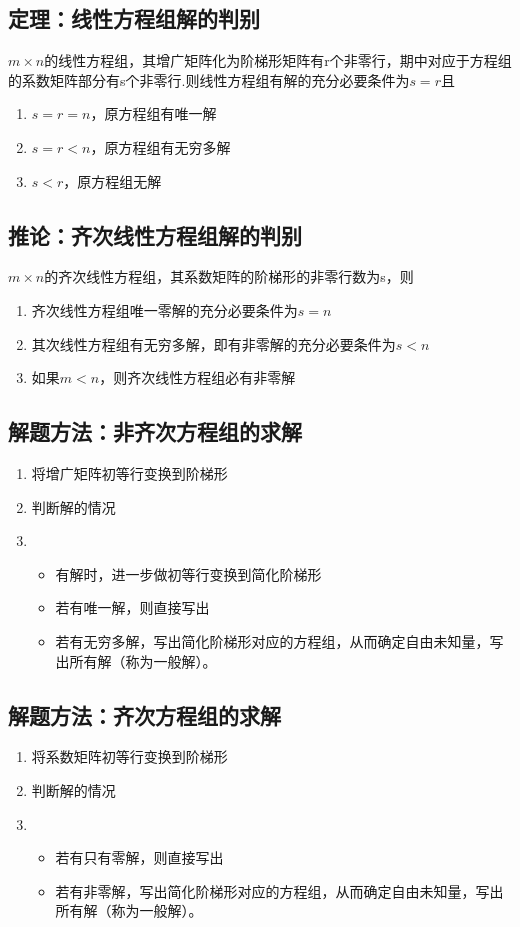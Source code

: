 \documentclass[a4paper]{ctexbook}
\begin{document}
\subsection{定理：线性方程组解的判别} \(m \times n\)的线性方程组，其增广矩阵化为阶梯形矩阵有r个非零行，期中对应于方程组的系数矩阵部分有s个非零行.则线性方程组有解的充分必要条件为\(s=r\)且
\begin{enumerate}
    \item \(s=r=n\)，原方程组有唯一解
    \item \(s=r<n\)，原方程组有无穷多解
    \item \(s<r\)，原方程组无解
\end{enumerate}
\subsection{推论：齐次线性方程组解的判别} \(m \times n\)的齐次线性方程组，其系数矩阵的阶梯形的非零行数为s，则
\begin{enumerate}
    \item 齐次线性方程组唯一零解的充分必要条件为\(s=n\)
    \item 其次线性方程组有无穷多解，即有非零解的充分必要条件为\(s<n\)
    \item 如果\(m<n\)，则齐次线性方程组必有非零解
\end{enumerate}
\subsection{解题方法：非齐次方程组的求解}
\begin{enumerate}
    \item 将增广矩阵初等行变换到阶梯形
    \item 判断解的情况
    \item {\begin{itemize}
        \item 有解时，进一步做初等行变换到简化阶梯形
        \item 若有唯一解，则直接写出
        \item 若有无穷多解，写出简化阶梯形对应的方程组，从而确定自由未知量，写出所有解（称为一般解）。
        \end{itemize}}
\end{enumerate}

\subsection{解题方法：齐次方程组的求解}
\begin{enumerate}
    \item 将系数矩阵初等行变换到阶梯形
    \item 判断解的情况
    \item {\begin{itemize}
        \item 若有只有零解，则直接写出
        \item 若有非零解，写出简化阶梯形对应的方程组，从而确定自由未知量，写出所有解（称为一般解）。
        \end{itemize}}
\end{enumerate}
\end{document}
